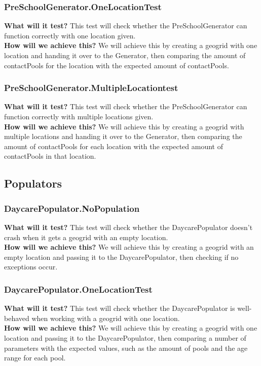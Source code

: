 \documentclass{article}
\begin{document}
\subsubsection{PreSchoolGenerator.OneLocationTest}
\textbf{What will it test?}
This test will check whether the PreSchoolGenerator can function correctly with one location given. \\
\newline
\textbf{How will we achieve this?}
We will achieve this by creating a geogrid with one location and handing it over to the Generator, then comparing the amount of contactPools for the location with the expected amount of contactPools.

\subsubsection{PreSchoolGenerator.MultipleLocationtest}
\textbf{What will it test?}
This test will check whether the PreSchoolGenerator can function correctly with multiple locations given. \\
\newline
\textbf{How will we achieve this?}
We will achieve this by creating a geogrid with multiple locations and handing it over to the Generator, then comparing the amount of contactPools for each location with the expected amount of contactPools in that location.

\subsection{Populators}
\subsubsection{DaycarePopulator.NoPopulation}
\textbf{What will it test?}
This test will check whether the DaycarePopulator doesn't crash when it gets a geogrid with an empty location. \\
\newline
\textbf{How will we achieve this?}
We will achieve this by creating a geogrid with an empty location and passing it to the DaycarePopulator, then checking if no exceptions occur.

\subsubsection{DaycarePopulator.OneLocationTest}
\textbf{What will it test?}
This test will check whether the DaycarePopulator is well-behaved when working with a geogrid with one location. \\
\newline
\textbf{How will we achieve this?}
We will achieve this by creating a geogrid with one location and passing it to the DaycarePopulator, then comparing a number of parameters with the expected values, such as the amount of pools and the age range for each pool.
\end{document}

